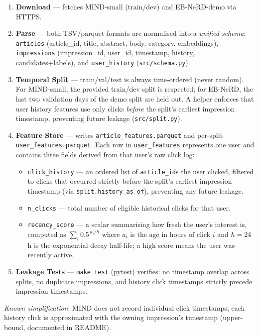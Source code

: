 \documentclass[11pt,a4paper]{article}
\begin{document}
\begin{enumerate}
  \item \textbf{Download} --- fetches MIND-small (train/dev) and EB-NeRD-demo via HTTPS.
  \item \textbf{Parse} --- both TSV/parquet formats are normalised into a \emph{unified schema}: \texttt{articles} (article\_id, title, abstract, body, category, embeddings), \texttt{impressions} (impression\_id, user\_id, timestamp, history, candidates+labels), and \texttt{user\_history} (\texttt{src/schema.py}).
  \item \textbf{Temporal Split} --- train/val/test is always time-ordered (never random).  For MIND-small, the provided train/dev split is respected; for EB-NeRD, the last two validation days of the demo split are held out.  A helper enforces that user history features use only clicks \emph{before} the split's earliest impression timestamp, preventing future leakage (\texttt{src/split.py}).
  \item \textbf{Feature Store} --- writes \texttt{article\_features.parquet} and per-split \texttt{user\_features.parquet}.
  Each row in \texttt{user\_features} represents one user and contains three fields derived from that user's raw click log:
  \begin{itemize}
    \item \texttt{click\_history} --- an ordered list of \texttt{article\_id}s the user clicked, filtered to clicks that occurred strictly before the split's earliest impression timestamp (via \texttt{split.history\_as\_of}), preventing any future leakage.
    \item \texttt{n\_clicks} --- total number of eligible historical clicks for that user.
    \item \texttt{recency\_score} --- a scalar summarising how fresh the user's interest is, computed as $\sum_{i} 0.5^{\,a_i / h}$ where $a_i$ is the age in hours of click $i$ and $h{=}24$ h is the exponential decay half-life; a high score means the user was recently active.
  \end{itemize}
  \item \textbf{Leakage Tests} --- \texttt{make test} (pytest) verifies: no timestamp overlap across splits, no duplicate impressions, and history click timestamps strictly precede impression timestamps.
\end{enumerate}

\textit{Known simplification}: MIND does not record individual click timestamps; each history click is approximated with the owning impression's timestamp (upper-bound, documented in README).
\end{document}
